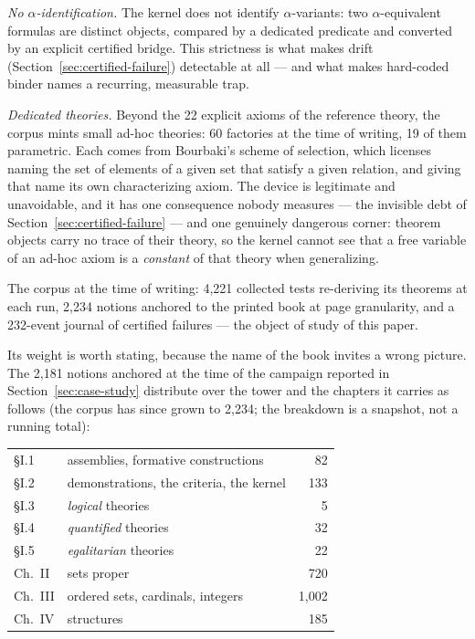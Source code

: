 \documentclass[11pt]{article}
\theoremstyle{remark}\newtheorem{example}{Example}
\begin{document}
\emph{No $\alpha$-identification.} The kernel does not identify $\alpha$-variants:
two $\alpha$-equivalent formulas are distinct objects, compared by a dedicated
predicate and converted by an explicit certified bridge. This strictness is what
makes drift (Section~\ref{sec:certified-failure}) detectable at all --- and what
makes hard-coded binder names a recurring, measurable trap.

\emph{Dedicated theories.} Beyond the 22 explicit axioms of the reference theory, the
corpus mints small ad-hoc theories: 60 factories at the time of writing, 19 of them
parametric. Each comes from Bourbaki's
scheme of selection, which licenses naming the set of elements of a given set that
satisfy a given relation, and giving that name its own characterizing axiom. The device
is legitimate and unavoidable, and it has one consequence nobody measures --- the
invisible debt of Section~\ref{sec:certified-failure} --- and one genuinely dangerous
corner: theorem objects carry no trace of their theory, so the kernel cannot see that
a free variable of an ad-hoc axiom is a \emph{constant} of that theory when
generalizing.

The corpus at the time of writing: 4{,}221 collected tests re-deriving its theorems at
each run, 2{,}234 notions anchored to the printed book at page granularity, and a
232-event journal of certified failures --- the object of study of this paper.

Its weight is worth stating, because the name of the book invites a wrong picture. The
2{,}181 notions anchored at the time of the campaign reported in
Section~\ref{sec:case-study} distribute over the tower and the chapters it carries as
follows (the corpus has since grown to 2{,}234; the breakdown is a snapshot, not a
running total):

\begin{center}\small
\begin{tabular}{llr}
\toprule
\S I.1 & assemblies, formative constructions & 82 \\
\S I.2 & demonstrations, the criteria, the kernel & 133 \\
\S I.3 & \emph{logical} theories & 5 \\
\S I.4 & \emph{quantified} theories & 32 \\
\S I.5 & \emph{egalitarian} theories & 22 \\
\midrule
Ch.~II & sets proper & 720 \\
Ch.~III & ordered sets, cardinals, integers & 1{,}002 \\
Ch.~IV & structures & 185 \\
\bottomrule
\end{tabular}
\end{center}
\end{document}
